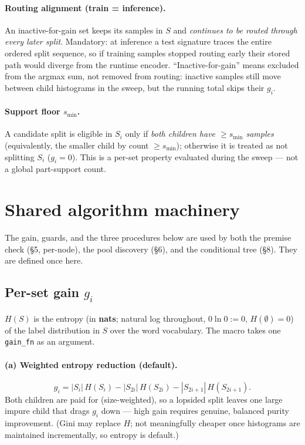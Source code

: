 \documentclass[11pt]{article}
\newcommand{\code}[1]{\texttt{#1}}
\newcommand{\gfn}{\code{gain\_fn}}
\begin{document}
\paragraph{Routing alignment (train = inference).} An inactive-for-gain set keeps its samples in $S$ and \emph{continues to be routed through every later split}. Mandatory: at inference a test signature traces the entire ordered split sequence, so if training samples stopped routing early their stored path would diverge from the runtime encoder. ``Inactive-for-gain'' means excluded from the argmax sum, not removed from routing: inactive samples still move between child histograms in the sweep, but the running total skips their $g_i$.

\paragraph{Support floor $s_{\min}$.} A candidate split is eligible in $S_i$ only if \emph{both children have $\ge s_{\min}$ samples} (equivalently, the smaller child by count $\ge s_{\min}$); otherwise it is treated as not splitting $S_i$ ($g_i=0$). This is a per-set property evaluated during the sweep --- not a global part-support count.



\section{Shared algorithm machinery}

The gain, guards, and the three procedures below are used by both the premise check (\S5, per-node), the pool discovery (\S6), and the conditional tree (\S8). They are defined once here.

\subsection{Per-set gain \texorpdfstring{$g_i$}{g\_i}}
$H(S)$ is the entropy (in \textbf{nats}; natural log throughout, $0\ln 0:=0$, $H(\emptyset)=0$) of the label distribution in $S$ over the word vocabulary. The macro takes one \gfn{} as an argument.

\paragraph{(a) Weighted entropy reduction (default).}
\[
g_i = |S_i|\,H(S_i) - |S_{2i}|\,H(S_{2i}) - |S_{2i+1}|\,H(S_{2i+1}).
\]
Both children are paid for (size-weighted), so a lopsided split leaves one large impure child that drags $g_i$ down --- high gain requires genuine, balanced purity improvement. (Gini may replace $H$; not meaningfully cheaper once histograms are maintained incrementally, so entropy is default.)
\end{document}
